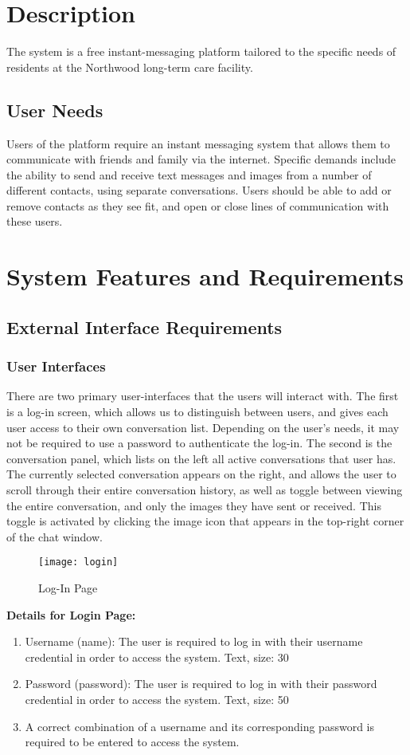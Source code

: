 \documentclass[11pt]{article}
\begin{document}
\section{Description}
The system is a free instant-messaging platform tailored to the specific needs of residents at the
Northwood long-term care facility.

\subsection{User Needs}
Users of the platform require an instant messaging system that allows them to communicate with
friends and family via the internet. Specific demands include the ability to send and receive text
messages and images from a number of different contacts, using separate conversations. Users should
be able to add or remove contacts as they see fit, and open or close lines of communication with
these users.
\section{System Features and Requirements}
\subsection{External Interface Requirements}
\subsubsection{User Interfaces}
There are two primary user-interfaces that the users will interact with. The first is a log-in
screen, which allows us to distinguish between users, and gives each user access to their own
conversation list. Depending on the user's needs, it may not be required to use a password to
authenticate the log-in. The second is the conversation panel, which lists on the left all active
conversations that user has. The currently selected conversation appears on the right, and allows
the user to scroll through their entire conversation history, as well as toggle between viewing the
entire conversation, and only the images they have sent or received. This toggle is activated by
clicking the image icon that appears in the top-right corner of the chat window.

\begin{figure}[!htb]
  \texttt{[image: login]}
  \caption{Log-In Page}
\end{figure}

\noindent \textbf{Details for Login Page:}
\begin{enumerate}
    \item Username (name): The user is required to log in with their username credential in order to
        access the system. Text, size: 30
    \item Password (password): The user is required to log in with their password credential in
        order to access the system. Text, size: 50
    \item A correct combination of a username and its corresponding password is required to be
        entered to access the system.
\end{enumerate}
\end{document}
